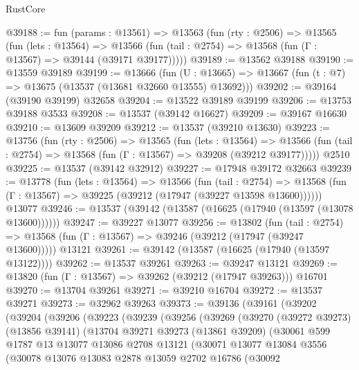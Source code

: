 \begin{lexlean}{RustCore}
\begin{coremodule}
@39188 := fun (params : @13561) =>
  @13563
    (fun (rty : @2506) =>
    @13565
      (fun (lets : @13564) =>
      @13566 (fun (tail : @2754) => @13568 (fun (Γ : @13567) => @39144 (@39171 @39177)))))
@39189 := @13562 @39188
@39190 := @13559 @39189
@39199 := @13666
    (fun (U : @13665) => @13667 (fun (t : @7) => @13675 (@13537 (@13681 @32660 @13555) @13692)))
@39202 := @39164 (@39190 @39199) @32658
@39204 := @13522 @39189 @39199
@39206 := @13753 @39188 @3533
@39208 := @13537 (@39142 @16627)
@39209 := @39167 @16630
@39210 := @13609 @39209
@39212 := @13537 (@39210 @13630)
@39223 := @13756
    (fun (rty : @2506) =>
    @13565
      (fun (lets : @13564) =>
      @13566 (fun (tail : @2754) => @13568 (fun (Γ : @13567) => @39208 (@39212 @39177)))))
    @2510
@39225 := @13537 (@39142 @32912)
@39227 := @17948 @39172 @32663
@39239 := @13778
    (fun (lets : @13564) =>
    @13566
      (fun (tail : @2754) =>
      @13568 (fun (Γ : @13567) => @39225 (@39212 (@17947 (@39227 @13598 @13600))))))
    @13077
@39246 := @13537 (@39142 (@13587 (@16625 (@17940 (@13597 (@13078 @13600))))))
@39247 := @39227 @13077
@39256 := @13802
    (fun (tail : @2754) => @13568 (fun (Γ : @13567) => @39246 (@39212 (@17947 (@39247 @13600)))))
    @13121
@39261 := @39142 (@13587 (@16625 (@17940 (@13597 @13122))))
@39262 := @13537 @39261
@39263 := @39247 @13121
@39269 := @13820 (fun (Γ : @13567) => @39262 (@39212 (@17947 @39263))) @16701
@39270 := @13704 @39261
@39271 := @39210 @16704
@39272 := @13537 @39271
@39273 := @32962 @39263
@39373 := @39136
    (@39161
      (@39202
        (@39204
          (@39206
            (@39223
              (@39239
                (@39256
                  (@39269
                    (@39270
                      (@39272 @39273)
                      (@13856 @39141)
                      (@13704
                        @39271
                        @39273
                        (@13861 @39209)
                        (@30061
                          @599
                          @1787
                          @13
                          @13077
                          @13086
                          @2708
                          @13121
                          (@30071
                            @13077
                            @13084
                            @3556
                            (@30078
                              @13076
                              @13083
                              @2878
                              @13059
                              @2702
                              @16786
                              (@30092

\end{coremodule}
\end{lexlean}

